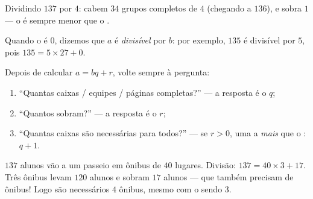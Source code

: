 \begin{omfigure}

{\small Dividindo $137$ por $4$: cabem $34$ grupos completos de $4$
(chegando a $136$), e sobra $1$ --- o  é sempre menor que o
.}
\end{omfigure}

\begin{definition}[Divisível]\label{def:g6:wholes:divisible}
Quando o  é $0$, dizemos que $a$ é \emph{divisível}
por $b$: por exemplo, $135$ é divisível por $5$, pois
$135 = 5 \times 27 + 0$.
\end{definition}

\begin{method}\label{met:g6:wholes:problems}
Depois de calcular $a = bq + r$, volte sempre à pergunta:
\begin{enumerate}
  \item ``Quantas caixas / equipes / páginas completas?'' --- a resposta é
        o  $q$;
  \item ``Quantos sobram?'' --- a resposta é o  $r$;
  \item ``Quantas caixas são necessárias para todos?'' --- se $r > 0$, uma
        a \emph{mais} que o : $q + 1$.
\end{enumerate}
\end{method}

\begin{example}\label{ex:g6:wholes:bus}
$137$ alunos vão a um passeio em ônibus de $40$ lugares. Divisão:
$137 = 40 \times 3 + 17$. Três ônibus levam $120$ alunos e sobram $17$
alunos --- que também precisam de ônibus! Logo são necessários $4$
ônibus, mesmo com o  sendo $3$.
\end{example}

